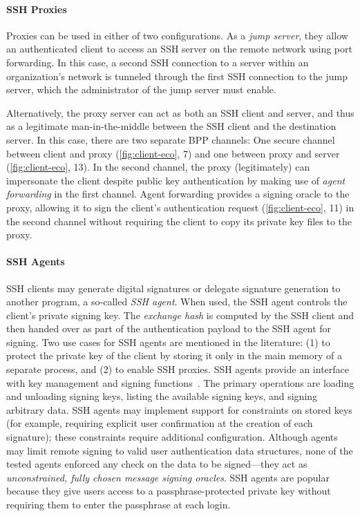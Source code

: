 \paragraph{SSH Proxies}

Proxies can be used in either of two configurations. As a \emph{jump server}, they allow an authenticated client to access an SSH server on the remote network using port forwarding. In this case, a second SSH connection to a server within an organization's network is tunneled through the first SSH connection to the jump server, which the administrator of the jump server must enable.

Alternatively, the proxy server can act as both an SSH client and server, and thus as a legitimate man-in-the-middle between the SSH client and the destination server. In this case, there are two separate BPP channels: One secure channel between client and proxy (\autoref{fig:client-eco}, 7) and one between proxy and server (\autoref{fig:client-eco}, 13). In the second channel, the proxy (legitimately) can impersonate the client despite public key authentication by making use of \emph{agent forwarding} in the first channel. Agent forwarding provides a signing oracle to the proxy, allowing it to sign the client's authentication request (\autoref{fig:client-eco}, 11) in the second channel without requiring the client to copy its private key files to the proxy.

\paragraph{SSH Agents}

SSH clients may generate digital signatures or delegate signature generation to another program, a so-called \emph{SSH agent}. When used, the SSH agent controls the client's private signing key. The \emph{exchange hash} is computed by the SSH client and then handed over as part of the authentication payload to the SSH agent for signing. Two use cases for SSH agents are mentioned in the literature: (1) to protect the private key of the client by storing it only in the main memory of a separate process, and (2) to enable SSH proxies. SSH agents provide an interface with key management and signing functions~\cite{ietf-sshm-ssh-agent-01}. The primary operations are loading and unloading signing keys, listing the available signing keys, and signing arbitrary data. SSH agents may implement support for constraints on stored keys (for example, requiring explicit user confirmation at the creation of each signature); these constraints require additional configuration. Although agents may limit remote signing to valid user authentication data structures, none of the tested agents enforced any check on the data to be signed---they act as \emph{unconstrained, fully chosen message signing oracles}. SSH agents are popular because they give users access to a passphrase-protected private key without requiring them to enter the passphrase at each login.

